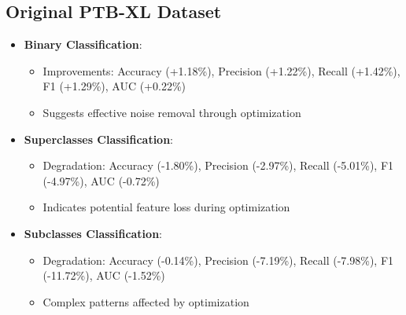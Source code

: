 \documentclass[12pt,a4paper]{article}
\begin{document}
\subsection{Original PTB-XL Dataset}
\begin{itemize}
    \item \textbf{Binary Classification}:
    \begin{itemize}
        \item Improvements: Accuracy (+1.18\%), Precision (+1.22\%), Recall (+1.42\%), F1 (+1.29\%), AUC (+0.22\%)
        \item Suggests effective noise removal through optimization
    \end{itemize}
    
    \item \textbf{Superclasses Classification}:
    \begin{itemize}
        \item Degradation: Accuracy (-1.80\%), Precision (-2.97\%), Recall (-5.01\%), F1 (-4.97\%), AUC (-0.72\%)
        \item Indicates potential feature loss during optimization
    \end{itemize}
    
    \item \textbf{Subclasses Classification}:
    \begin{itemize}
        \item Degradation: Accuracy (-0.14\%), Precision (-7.19\%), Recall (-7.98\%), F1 (-11.72\%), AUC (-1.52\%)
        \item Complex patterns affected by optimization
    \end{itemize}
\end{itemize}
\end{document}
